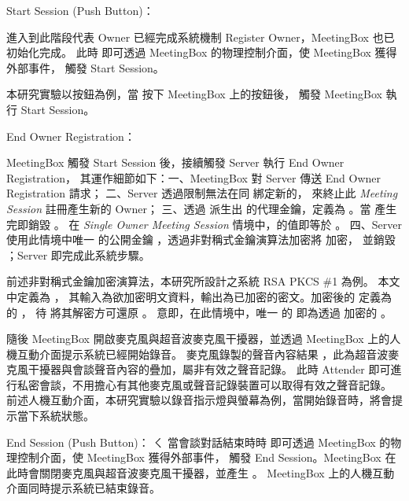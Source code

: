 \begin{steps}
    \item Start Session (Push Button)：

            進入到此階段代表 Owner 已經完成系統機制 Register Owner，MeetingBox 也已初始化完成。
        此時 \DEFattender 即可透過 MeetingBox 的物理控制介面，使 MeetingBox 獲得外部事件，
        觸發 Start Session。

            本研究實驗以按鈕為例，當 \DEFattender 按下 MeetingBox 上的按鈕後，
        觸發 MeetingBox 執行 Start Session。

    \item End Owner Registration：

            MeetingBox 觸發 Start Session 後，接續觸發 Server 執行 End Owner Registration，
        其運作細節如下：一、MeetingBox 對 Server 傳送 End Owner Registration 請求；
        二、Server 透過限制無法在同 \DEFsessionID 綁定新的\DEFprivateKey，
        來終止此 {\it Meeting Session} 註冊產生新的 Owner；
        三、透過 \DEFunsealKey 派生出 \DEFowner 的代理金鑰，定義為 \DEFagentKey。當 \DEFagentKey 產生完即銷毀 \DEFunsealKey 。
        在 {\it Single Owner Meeting Session} 情境中，\DEFagentKey 的值即等於 \DEFunsealKey。
        四、Server 使用此情境中唯一 \DEFowner 的公開金鑰 \DEFpublicKey，透過非對稱式金鑰演算法加密將 \DEFagentKey 加密，
        並銷毀 \DEFagentKey；Server 即完成此系統步驟。

            前述非對稱式金鑰加密演算法，本研究所設計之系統 RSA PKCS \#1 為例。 本文中定義為 \DEFfuncEncPK，
        其輸入為欲加密明文資料，輸出為已加密的密文。加密後的 \DEFagentKey 定義為 \DEFowner 的 \DEFakEnc，
        待 \DEFowner 將其解密方可還原 \DEFagentKey。
        意即，在此情境中，唯一 \DEFowner 的 \DEFakEnc 即為透過 \DEFfuncEncPK 加密的 \DEFunsealKey。

            隨後 MeetingBox 開啟麥克風與超音波麥克風干擾器，並透過 MeetingBox 上的人機互動介面提示系統已經開始錄音。
        麥克風錄製的聲音內容結果 \DEFrecJ，此為超音波麥克風干擾器與會談聲音內容的疊加，屬非有效之聲音記錄。
        此時 Attender 即可進行私密會談，不用擔心有其他麥克風或聲音記錄裝置可以取得有效之聲音記錄。
        前述人機互動介面，本研究實驗以錄音指示燈與螢幕為例，當開始錄音時，將會提示當下系統狀態。

    \item End Session (Push Button)：
ㄑ
            當會談對話結束時時 \DEFattender 即可透過 MeetingBox 的物理控制介面，使 MeetingBox 獲得外部事件，
        觸發 End Session。MeetingBox 在此時會關閉麥克風與超音波麥克風干擾器，並產生 \DEFrecJ。
        MeetingBox 上的人機互動介面同時提示系統已結束錄音。


\end{steps}
